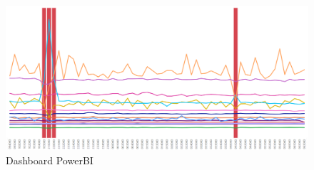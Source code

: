 \begin{figure}[t]
\centering
\includegraphics[width=14cm, scale=1]{images/powerbi}
  \caption{Dashboard PowerBI}
	\label{powerbi}

\end{figure}


